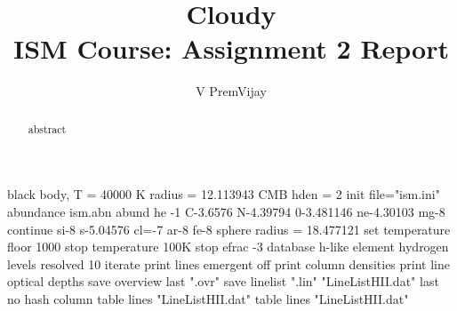 \documentclass[]{article}
\title{Cloudy\\ ISM Course: Assignment 2 Report}
\author{V PremVijay}
\begin{document}
\maketitle

\begin{abstract}
abstract
\end{abstract}

\section{}

black body, T = 40000 K radius = 12.113943
CMB
hden = 2
init file="ism.ini"
abundance ism.abn
abund he -1 C-3.6576 N-4.39794 0-3.481146 ne-4.30103 mg-8 
continue si-8 s-5.04576 cl=-7 ar-8 fe-8
sphere
radius = 18.477121
set temperature floor 1000 
stop temperature 100K
stop efrac -3
database h-like element hydrogen levels resolved 10
iterate
print lines emergent off 
print column densities 
print line optical depths 
save overview last ".ovr"
save linelist ".lin" "LineListHII.dat" last no hash column table lines "LineListHII.dat"
table lines "LineListHII.dat"
\end{document}
